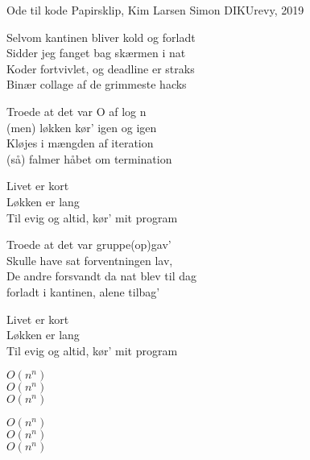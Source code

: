 \begin{song}{Ode til kode}
  {} %
  {Papirsklip, Kim Larsen} %
  {Simon} %
  {DIKUrevy, 2019} %
  {\NotCCLIed} %

  \begin{SBVerse}
    Selvom kantinen bliver kold og forladt \\
    Sidder jeg fanget bag skærmen i nat \\
    Koder fortvivlet, og deadline er straks  \\
    Binær collage af de grimmeste hacks \\\medskip

    Troede at det var O af log n \\
    (men) løkken kør' igen og igen \\
    Kløjes i mængden af iteration \\
    (så) falmer håbet om termination
  \end{SBVerse}
  \begin{SBChorus}
    Livet er kort \\
    Løkken er lang \\
    Til evig og altid, kør' mit program
  \end{SBChorus}
  \begin{SBVerse}
    Troede at det var gruppe(op)gav' \\
    Skulle have sat forventningen lav, \\
    De andre forsvandt da nat blev til dag \\
    forladt i kantinen, alene tilbag'
  \end{SBVerse}
  \begin{SBChorus}
    Livet er kort \\
    Løkken er lang \\
    Til evig og altid, kør' mit program
  \end{SBChorus}

  \begin{SBSection*}
    $O(n^n)$ \\
    $O(n^n)$ \\
    $O(n^n)$ \\ \medskip
    
    $O(n^n)$ \\
    $O(n^n)$ \\
    $O(n^n)$ \\
  \end{SBSection*}


\end{song}
